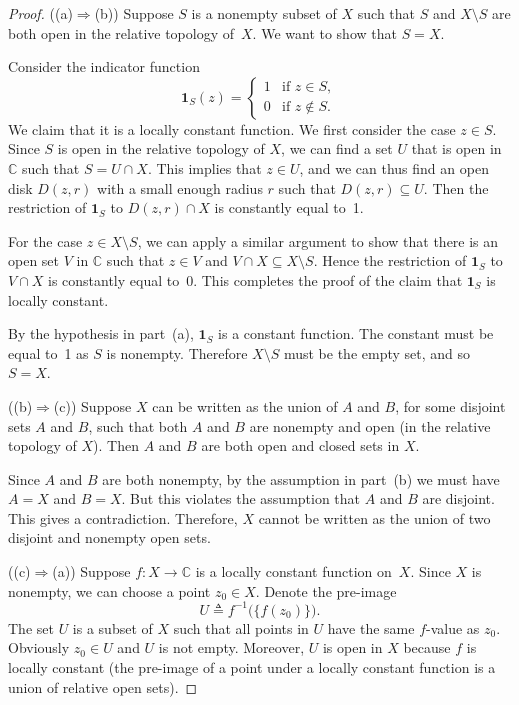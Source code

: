 \begin{proof}
	((a)$\Rightarrow$(b)) 
	Suppose $S$ is a nonempty subset of $X$ such that $S$ and $X\setminus S$
	are both open in the relative topology of~$X$. We want to show that $S=X$.
	
	Consider the indicator function
	\[
	\mathbf{1}_S(z) = 
	\begin{cases}
		1 & \text{if } z\in S,\\
		0 & \text{if } z \not\in S.
	\end{cases}
	\]
	We claim that it is a locally constant function. We first consider the case $z\in S$. Since
	$S$ is open in the relative topology of $X$, we can find a set $U$ that is open in
	$\mathbb{C}$ such that $S = U\cap X$. This implies that $z\in U$, and we can thus find an
	open disk $D(z,r)$ with a small enough radius $r$ such that $D(z,r)\subseteq U$. Then the
	restriction of $\mathbf{1}_S$ to $D(z,r)\cap X$ is constantly equal to~1. 
	
	For the case $z\in X\setminus S$, we can apply a similar argument to show that there is an
	open set $V$ in $\mathbb{C}$ such that $z\in V$ and $V\cap X \subseteq X\setminus S$. Hence
	the restriction of $\mathbf{1}_S$ to $V\cap X$ is constantly equal to~0. This completes the
	proof of the claim that $\mathbf{1}_S$ is locally constant.
	
	By the hypothesis in part~(a), $\mathbf{1}_S$ is a constant function. The constant must be
	equal to~1 as $S$ is nonempty. Therefore $X\setminus S$ must be the empty set, and so
	$S = X$.
	
	\medskip
	
	((b)$\Rightarrow$(c)) Suppose $X$ can be written as the union of $A$ and $B$, for some
	disjoint sets $A$ and $B$, such that both $A$ and $B$ are nonempty and open (in the relative
	topology of $X$). Then $A$ and $B$ are both open and closed sets in $X$.
	
	Since $A$ and $B$ are both nonempty, by the assumption in part~(b) we must have $A = X$ and
	$B = X$. But this violates the assumption that $A$ and $B$ are disjoint. This gives a
	contradiction. Therefore, $X$ cannot be written as the union of two disjoint and nonempty
	open sets.
	
	\medskip
	
	((c)$\Rightarrow$(a)) Suppose $f:X\to\mathbb{C}$ is a locally constant function on~$X$. Since
	$X$ is nonempty, we can choose a point $z_0\in X$. Denote the pre-image
	\[
	U \triangleq f^{-1}\bigl(\{f(z_0)\}\bigr).
	\]
	The set $U$ is a subset of $X$ such that all points in $U$ have the same $f$-value as $z_0$.
	Obviously $z_0 \in U$ and $U$ is not empty. Moreover, $U$ is open in $X$ because $f$ is
	locally constant (the pre-image of a point under a locally constant function is a union of
	relative open sets).
	

\end{proof}
